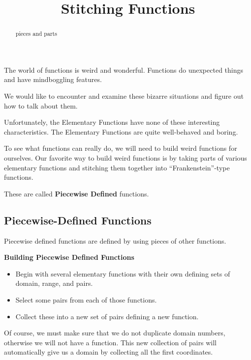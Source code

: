 \documentclass{ximera}
\title{Stitching Functions}
\begin{document}
\begin{abstract}
pieces and parts
\end{abstract}
\maketitle


The world of functions is weird and wonderful. Functions do unexpected things and have mindboggling features.

We would like to encounter and examine these bizarre situations and figure out how to talk about them.

Unfortunately, the Elementary Functions have none of these interesting characteristics. The Elementary Functions are quite well-behaved and boring.

To see what functions can really do, we will need to build weird functions for ourselves. Our favorite way to build weird functions is by taking parts of various elementary functions and stitching them together into ``Frankenstein''-type functions.

These are called \textbf{Piecewise Defined} functions.









\subsection*{Piecewise-Defined Functions}

Piecewise defined functions are defined by using pieces of other functions. 


\begin{procedure} \textbf{\textcolor{purple!30!blue}{Building Piecewise Defined Functions}} 

\begin{itemize}
\item Begin with several elementary functions with their own defining sets of domain, range, and pairs.  
\item Select some pairs from each of those functions. 
\item Collect these into a new set of pairs defining a new function.  
\end{itemize}

\end{procedure}

Of course, we must make sure that we do not duplicate domain numbers, otherwise we will not have a function.  This new collection of pairs will automatically give us a domain by collecting all the first coordinates.
\end{document}
